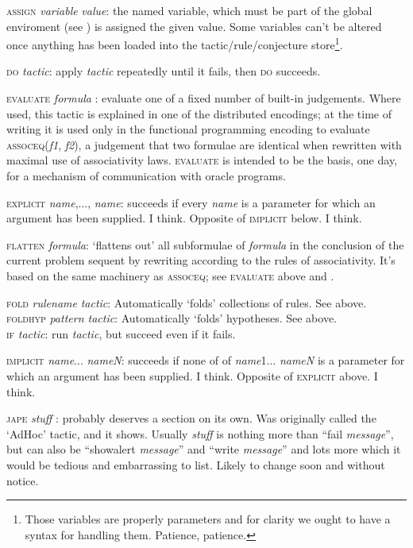 \textsc{assign} \textit{variable} \textit{value}: the named variable, which must be part of the global enviroment (see ) is assigned the given value. Some variables can't be altered once anything has been loaded into the tactic/rule/conjecture store\footnote{Those variables are properly parameters and for clarity we ought to have a syntax for handling them. Patience, patience.}.


\textsc{do} \textit{tactic}: apply \textit{tactic} repeatedly until it fails, then \textsc{do} succeeds.


\textsc{evaluate} \textit{formula} : evaluate one of a fixed number of built-in judgements. Where used, this tactic is explained in one of the distributed encodings; at the time of writing it is used only in the functional programming encoding to evaluate \textsc{assoceq}(\textit{f1}, \textit{f2}), a judgement that two formulae are identical when rewritten with maximal use of associativity laws. \textsc{evaluate} is intended to be the basis, one day, for a mechanism of communication with oracle programs.


\textsc{explicit} \textit{name},..., \textit{name}: succeeds if every \textit{name} is a parameter for which an argument has been supplied. I think. Opposite of \textsc{implicit} below. I think.


\textsc{flatten} \textit{formula}: `flattens out' all subformulae of \textit{formula} in the conclusion of the current problem sequent by rewriting according to the rules of associativity. It's based on the same machinery as \textsc{assoceq}; see \textsc{evaluate} above and .


\textsc{fold} \textit{rulename} \textit{tactic}: Automatically `folds' collections of rules. See  above.\\
\textsc{foldhyp} \textit{pattern tactic}: Automatically `folds' hypotheses. See  above.\\
\textsc{if} \textit{tactic}: run \textit{tactic}, but succeed even if it fails.


\textsc{implicit} \textit{name}... \textit{nameN}: succeeds if none of of \textit{name}1... \textit{nameN} is a parameter for which an argument has been supplied. I think. Opposite of \textsc{explicit} above. I think.


\textsc{jape} \textit{stuff} : probably deserves a section on its own. Was originally called the `AdHoc' tactic, and it shows. Usually \textit{stuff} is nothing more than ``fail \textit{message}'', but can also be ``showalert \textit{message}'' and ``write \textit{message}'' and lots more which it would be tedious and embarrassing to list. Likely to change soon and without notice.



